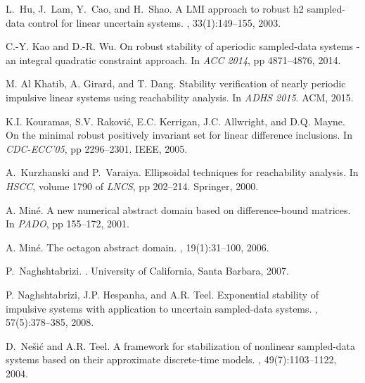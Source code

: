 \begin{thebibliography}{10}
L.~Hu, J.~Lam, Y.~Cao, and H.~Shao.
\newblock A  {LMI} approach to robust h2 sampled- data control for linear
  uncertain systems.
, 33(1):149--155, 2003.

C.{-}Y. Kao and D.{-}R. Wu.
\newblock On robust stability of aperiodic sampled-data systems - an integral
  quadratic constraint approach.
\newblock In {\em ACC 2014}, pp 4871--4876, 2014.

M. Al Khatib, A. Girard, and T. Dang.
\newblock Stability verification of nearly periodic impulsive linear systems
  using reachability analysis.
\newblock In {\em ADHS 2015}. ACM, 2015.

K.I. Kouramas, S.V. Rakovi{\'c}, E.C. Kerrigan, J.C. Allwright, and D.Q. Mayne.
\newblock On the minimal robust positively invariant set for linear difference
  inclusions.
\newblock In {\em CDC-ECC'05}, pp 2296--2301. IEEE,
  2005.

A.~Kurzhanski and P.~Varaiya.
\newblock Ellipsoidal techniques for reachability analysis.
\newblock In {\em HSCC}, volume 1790 of {\em {LNCS}}, pp 202--214.
  {Springer}, 2000.

A. Min{\'e}.
\newblock A new numerical abstract domain based on difference-bound matrices.
\newblock In {\em PADO}, pp 155--172, 2001.

A. Min{\'e}.
\newblock The octagon abstract domain.
, 19(1):31--100, 2006.

P.~Naghshtabrizi.
.
\newblock University of California, Santa Barbara, 2007.

P. Naghshtabrizi, J.P. Hespanha, and A.R. Teel.
\newblock Exponential stability of impulsive systems with application to
  uncertain sampled-data systems.
, 57(5):378--385, 2008.

D.~Ne{\v{s}}i{\'c} and A.R. Teel.
\newblock A framework for stabilization of nonlinear sampled-data systems based
  on their approximate discrete-time models.
, 49(7):1103--1122, 2004.



\end{thebibliography}
